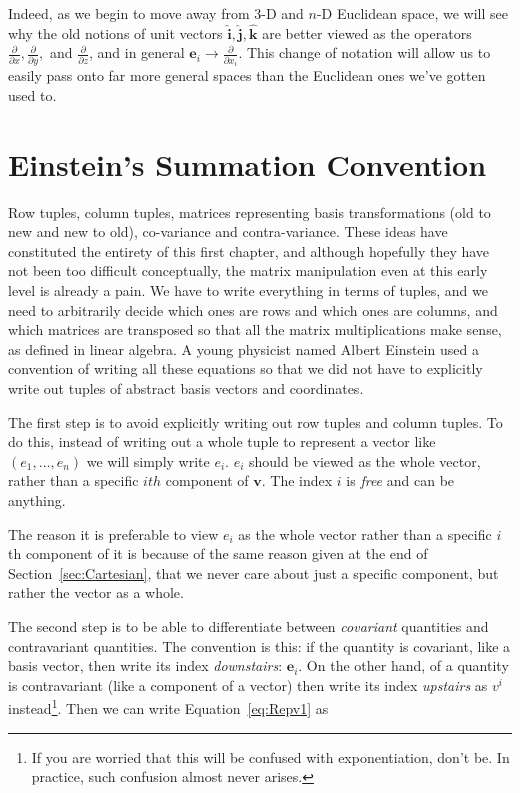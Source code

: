 \documentclass[../master.tex]{subfiles}
\begin{document}
	Indeed, as we begin to move away from 3-D and $n$-D Euclidean space, we will see why the old notions of unit vectors $\mathbf{\hat i}, \mathbf{\hat j}, \mathbf{\hat k}$ are better viewed as the operators $\frac{\partial}{\partial x}, \frac{\partial}{\partial y},$ and $ \frac{\partial}{\partial z}$, and in general $\mathbf e_i \rightarrow \frac{\partial}{\partial x_i}$. This change of notation will allow us to easily pass onto far more general spaces than the Euclidean ones we've gotten used to. 
	
	
	\section{Einstein's Summation Convention} %
	\label{sec:einstein's_summation_convention}
	
	Row tuples, column tuples, matrices representing basis transformations (old to new and new to old), co-variance and contra-variance. These ideas have constituted the entirety of this first chapter, and although hopefully they have not been too difficult conceptually, the matrix manipulation even at this early level is already a pain. We have to write everything in terms of tuples, and we need to arbitrarily decide which ones are rows and which ones are columns, and which matrices are transposed so that all the matrix multiplications make sense, as defined in linear algebra. A young physicist named Albert Einstein used a convention of writing all these equations so that we did not have to explicitly write out tuples of abstract basis vectors and coordinates.
	
	The first step is to avoid explicitly writing out row tuples and column tuples. To do this, instead of writing out a whole tuple to represent a vector like $(e_1, \dots, e_n)$ we will simply write $e_i$. $e_i$ should be viewed as the whole vector, rather than a specific $ith$ component of $\mathbf v$. The index $i$ is \emph{free} and can be anything. 
	
	The reason it is preferable to view $e_i$ as the whole vector rather than a specific $i$th component of it is because of the same reason given at the end of Section~\ref{sec:Cartesian}, that we never care about just a specific component, but rather the vector as a whole. 
	
	The second step is to be able to differentiate between \emph{covariant} quantities and contravariant quantities. The convention is this: if the quantity is covariant, like a basis vector, then write its index \emph{downstairs}: $\mathbf e_i$. On the other hand, of a quantity is contravariant (like a component of a vector) then write its index \emph{upstairs} as $v^i$ instead\footnote{If you are worried that this will be confused with exponentiation, don't be. In practice, such confusion almost never arises.}. Then we can write Equation~\eqref{eq:Repv1} as 
	
\end{document}
